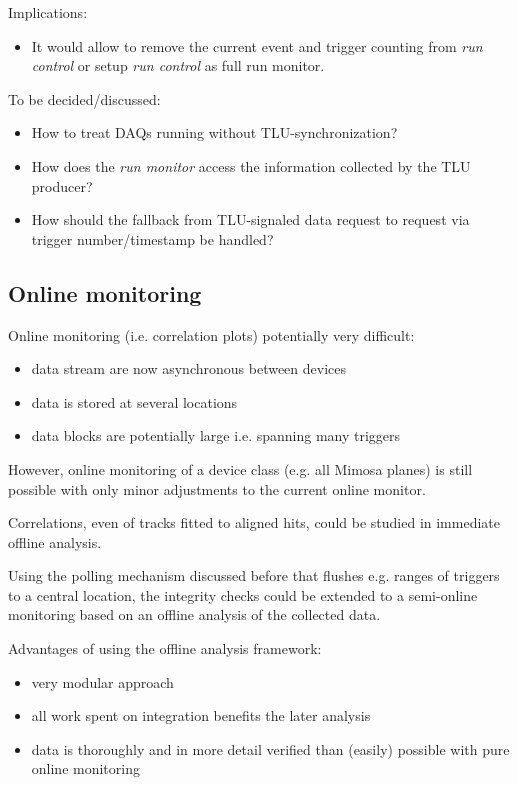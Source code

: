 \documentclass[paper=a4, fontsize=11pt]{scrartcl}	%
\numberwithin{equation}{section}		%
\numberwithin{figure}{section}			%
\numberwithin{table}{section}				%
\begin{document}
Implications:
\begin{itemize}
\item It would allow to remove the current event and trigger
  counting from \emph{run control} or setup \emph{run control} as full
  run monitor.
\end{itemize}

To be decided/discussed:
\begin{itemize}
\item How to treat DAQs running without TLU-synchronization?
\item How does the \emph{run monitor} access the information collected
  by the TLU producer?
\item How should the fallback from TLU-signaled data request to
  request via trigger number/timestamp be handled?
\end{itemize}

\subsection{Online monitoring}
\label{sec:online-monitoring}
Online monitoring (i.e. correlation plots) potentially very difficult:

\begin{itemize}
\item data stream are now asynchronous between devices
\item data is stored at several locations
\item data blocks are potentially large i.e. spanning many triggers
\end{itemize}

However, online monitoring of a device class (e.g. all Mimosa planes)
is still possible with only minor adjustments to the current online
monitor.

Correlations, even of tracks fitted to aligned hits, could be studied
in immediate offline analysis.

Using the polling mechanism discussed before that flushes e.g. ranges of triggers to a
central location, the integrity checks could be extended to a
semi-online monitoring based on an offline analysis of the collected data.

Advantages of using the offline analysis framework:
\begin{itemize}
\item very modular approach
\item all work spent on integration benefits the later analysis
\item data is thoroughly and in more detail verified than (easily) possible
  with pure online monitoring
\end{itemize}
\end{document}

